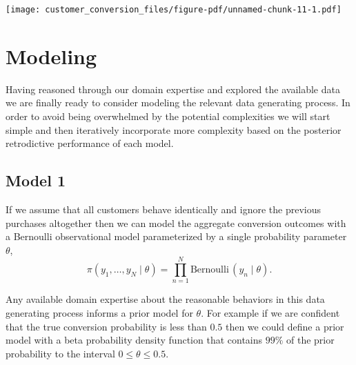 \documentclass[
  letterpaper,
  DIV=11,
  numbers=noendperiod]{scrartcl}
\newenvironment{Shaded}{\begin{snugshade}}{\end{snugshade}}
\newcommand{\AttributeTok}[1]{\textcolor[rgb]{0.40,0.45,0.13}{#1}}
\newcommand{\DecValTok}[1]{\textcolor[rgb]{0.68,0.00,0.00}{#1}}
\newcommand{\FloatTok}[1]{\textcolor[rgb]{0.68,0.00,0.00}{#1}}
\newcommand{\FunctionTok}[1]{\textcolor[rgb]{0.28,0.35,0.67}{#1}}
\newcommand{\NormalTok}[1]{\textcolor[rgb]{0.00,0.23,0.31}{#1}}
\newcommand{\OtherTok}[1]{\textcolor[rgb]{0.00,0.23,0.31}{#1}}
\newcommand{\SpecialCharTok}[1]{\textcolor[rgb]{0.37,0.37,0.37}{#1}}
\newcommand{\StringTok}[1]{\textcolor[rgb]{0.13,0.47,0.30}{#1}}
\begin{document}
\texttt{[image: customer\_conversion\_files/figure-pdf/unnamed-chunk-11-1.pdf]}

\section{Modeling}\label{modeling}

Having reasoned through our domain expertise and explored the available
data we are finally ready to consider modeling the relevant data
generating process. In order to avoid being overwhelmed by the potential
complexities we will start simple and then iteratively incorporate more
complexity based on the posterior retrodictive performance of each
model.

\subsection{Model 1}\label{model-1}

If we assume that all customers behave identically and ignore the
previous purchases altogether then we can model the aggregate conversion
outcomes with a Bernoulli observational model parameterized by a single
probability parameter \(\theta\), \[
\pi(y_{1}, \ldots, y_{N} \mid \theta)
=
\prod_{n = 1}^{N} \text{Bernoulli} \,(y_{n} \mid \theta).
\]

Any available domain expertise about the reasonable behaviors in this
data generating process informs a prior model for \(\theta\). For
example if we are confident that the true conversion probability is less
than \(0.5\) then we could define a prior model with a beta probability
density function that contains \(99\%\) of the prior probability to the
interval \(0 \le \theta \le 0.5\).

\begin{Shaded}
\end{Shaded}
\end{document}
